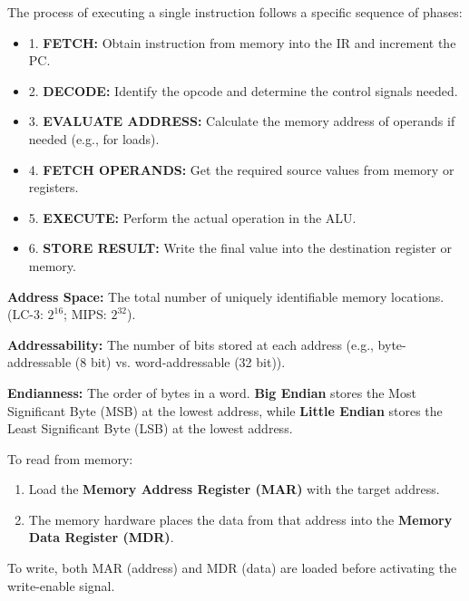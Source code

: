 \begin{remark}
	The process of executing a single instruction follows a specific sequence of phases:
	\begin{itemize}
		\item 1. \textbf{FETCH:} Obtain instruction from memory into the IR and increment the PC.
		\item 2. \textbf{DECODE:} Identify the opcode and determine the control signals needed.
		\item 3. \textbf{EVALUATE ADDRESS:} Calculate the memory address of operands if needed (e.g., for loads).
		\item 4. \textbf{FETCH OPERANDS:} Get the required source values from memory or registers.
		\item 5. \textbf{EXECUTE:} Perform the actual operation in the ALU.
		\item 6. \textbf{STORE RESULT:} Write the final value into the destination register or memory.
	\end{itemize}
\end{remark}

\begin{definition}
	\textbf{Address Space:} The total number of uniquely identifiable memory locations. (LC-3: $2^{16}$; MIPS: $2^{32}$).
\end{definition}

\begin{definition}
	\textbf{Addressability:} The number of bits stored at each address (e.g., byte-addressable (8 bit) vs. word-addressable (32 bit)).
\end{definition}

\begin{definition}
	\textbf{Endianness:} The order of bytes in a word. \textbf{Big Endian} stores the Most Significant Byte (MSB) at the lowest address, while \textbf{Little Endian} stores the Least Significant Byte (LSB) at the lowest address.
\end{definition}

\begin{example}
	To read from memory:
	\begin{enumerate}
		\item Load the \textbf{Memory Address Register (MAR)} with the target address.
		\item The memory hardware places the data from that address into the \textbf{Memory Data Register (MDR)}.
	\end{enumerate}
	To write, both MAR (address) and MDR (data) are loaded before activating the write-enable signal.
\end{example}

